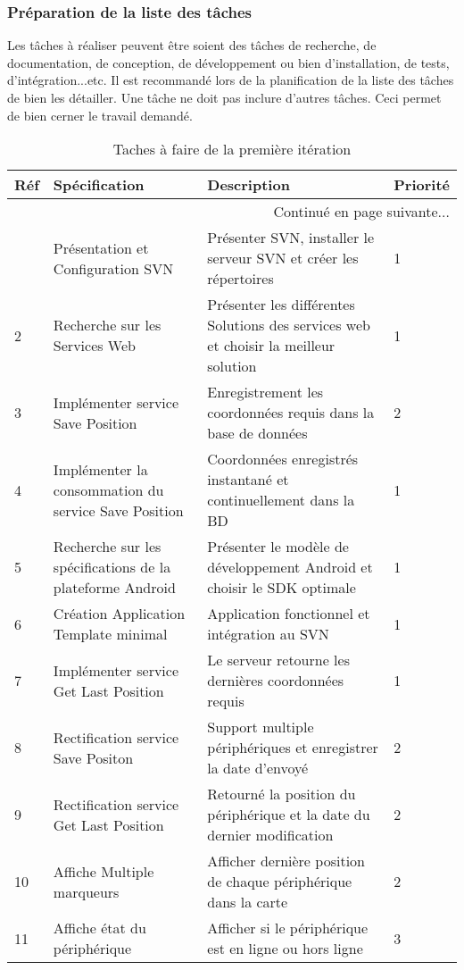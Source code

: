 \subsubsection{Préparation de la liste des tâches }
Les tâches à réaliser peuvent être soient des tâches de recherche, de documentation, de
conception, de développement ou bien d’installation, de tests, d’intégration...etc.
Il est recommandé lors de la planification de la liste des tâches de bien les détailler. Une tâche
ne doit pas inclure d’autres tâches. Ceci permet de bien cerner le travail demandé.
\begin{center}
    \footnotesize
    \begin{longtable}{| p{1cm} | p{5cm} | p{7cm} | p{1cm} |}
        \caption{Taches à faire de la première itération}
        \label{tab:sprint1-backlog} \\

 \hline
 \textbf{Réf} & \textbf{Spécification} & \textbf{Description} & \textbf{Priorité} \\ \hline
 \endhead

 \hline \multicolumn{4}{|r|}{{Continué en page suivante$\dotsc$}} \\ \hline
 \endfoot

 \hline \hline
 \endlastfoot

\hline
1 & Présentation et Configuration SVN & Présenter SVN, installer le serveur SVN et créer les répertoires  & 1 \\ \hline
2 & Recherche sur les Services Web & Présenter les différentes Solutions des services web et choisir la meilleur solution & 1 \\ \hline
3 & Implémenter service Save Position & Enregistrement les coordonnées requis dans la base de données & 2 \\ \hline
4 & Implémenter la consommation du service Save Position & Coordonnées enregistrés instantané et continuellement dans la BD & 1 \\ \hline
5 & Recherche sur les spécifications de la plateforme Android & Présenter le modèle de développement Android et choisir le SDK optimale & 1 \\ \hline
6 & Création Application Template minimal & Application fonctionnel et intégration au SVN & 1 \\ \hline
7 & Implémenter service Get Last Position & Le serveur retourne les dernières coordonnées requis & 1 \\ \hline
8 & Rectification service Save Positon & Support multiple périphériques et enregistrer la date d'envoyé & 2 \\ \hline
9 & Rectification service Get Last Position & Retourné la position du périphérique et la date du dernier modification & 2 \\ \hline
10 & Affiche Multiple marqueurs & Afficher dernière position de chaque périphérique dans la carte & 2 \\ \hline
11 & Affiche état du périphérique & Afficher si le périphérique est en ligne ou hors ligne & 3 \\ \hline
\end{longtable}
\end{center}

